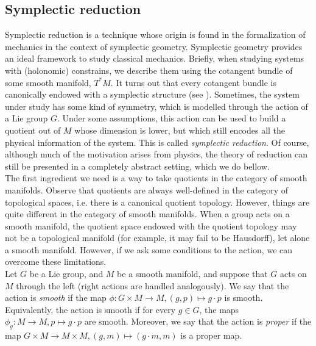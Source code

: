 \subsection{Symplectic reduction} \label{sec_symplectic_reduction}
Symplectic reduction is a technique whose origin is found in the formalization of mechanics in the context of symplectic geometry. Symplectic geometry provides an ideal framework to study classical mechanics. Briefly, when studying systems with (holonomic) constrains, we describe them using the cotangent bundle of some smooth manifold, \(T^*M\). It turns out that every cotangent bundle is canonically endowed with a symplectic structure (see \parencite[Ch. 2]{da2001lectures}). Sometimes, the system under study has some kind of symmetry, which is modelled through the action of a Lie group \(G\). Under some assumptions, this action can be used to build a quotient out of \(M\) whose dimension is lower, but which still encodes all the physical information of the system. This is called \textit{symplectic reduction}. Of course, although much of the motivation arises from physics, the theory of reduction can still be presented in a completely abstract setting, which we do bellow. \\

The first ingredient we need is a way to take quotients in the category of smooth manifolds. Observe that quotients are always well-defined in the category of topological spaces, i.e. there is a canonical quotient topology. However, things are quite different in the category of smooth manifolds. When a group acts on a smooth manifold, the quotient space endowed with the quotient topology may not be a topological manifold (for example, it may fail to be Hausdorff), let alone a smooth manifold. However, if we ask some conditions to the action, we can overcome these limitations. \\

Let \(G\) be a Lie group, and \(M\) be a smooth manifold, and suppose that \(G\) acts on \(M\) through the left (right actions are handled analogously). We say that the action is \textit{smooth} if the map \(\phi\colon G \times M \to M, (g,p) \mapsto g \cdot p\) is smooth. Equivalently, the action is smooth if for every \(g \in G\), the maps \(\phi_g\colon M \to M, p \mapsto g \cdot p\) are smooth. Moreover, we say that the action is \textit{proper} if the map \(G \times M \to M \times M, (g,m)\mapsto (g\cdot m, m)\) is a proper map.  \\

